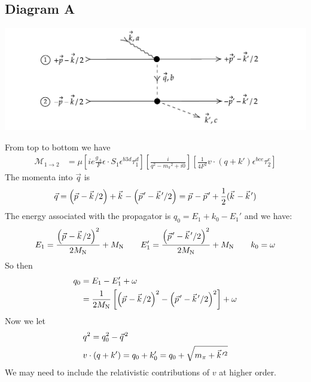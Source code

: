 \documentclass[11pt]{article}
\newcommand\ddfrac[2]{\frac{\displaystyle #1}{\displaystyle #2}}
\newcommand{\vectorwithspace}[1]{\vec{#1}\mkern2mu\vphantom{#1}}
\newcommand{\kv}{\vectorwithspace{k}}
\newcommand{\pv}{\vectorwithspace{p}}
\newcommand{\qv}{\vectorwithspace{q}}
\newcommand{\kpv}{\kv'}
\newcommand{\mpi}{\ensuremath{m_\pi}}
\newcommand{\ga}{\ensuremath{g_A}}
\newcommand{\MN}{\ensuremath{M_\mathrm{N}}} %
\newcommand{\calM}{\mathcal{M}} \newcommand{\calN}{\mathcal{N}}
\begin{document}
\subsection{Diagram A}
\begin{center}
	\includegraphics[scale=0.9]{2B-diagA.pdf}
\end{center}
From top to bottom we have
\begin{align}
	\calM_{1\to2} & =\mu \left[ i e \frac{\ga}{F} {\epsilon} \cdot {S}_1
		\epsilon^{b3d} \tau_1^d  \right]
	\left[ \ddfrac{i}{q^2 -\mpi^2+i0 }  \right]
	\left[ \frac{1}{4 F^2} v \cdot \left( q + k' \right) \epsilon^{bce}
		\tau_2^e \right]
\end{align}
The momenta into $\vec{q}$ is
\begin{equation}
	\vec{q}=\left(\pv-\kv/2 \right) +\kv -\left(
	\pv'-\kv'/2\right)=\pv-\pv' +\frac{1}{2} (\kv-\kpv)
\end{equation}
The energy associated with the propagator is $q_0=E_1+k_0-E_1'$ and we have:~\\
\begin{align}
	E_1= \ddfrac{ \left( \pv - \kv/2 \right)^2}{2\MN} +\MN\qquad
	E_1'= \ddfrac{ \left( \pv' - \kv'/2 \right)^2}{2\MN} +\MN\qquad
	k_0= \omega
\end{align}
So then
\begin{align}
	q_0 & =E_1-E_1'+\omega                                     \\
	    & =\frac{1}{2\MN}\left[ \left( \pv - \kv/2 \right)^2 -
		\left( \pv' - \kv'/2 \right)^2\right]+\omega \label{qzero}
\end{align}
Now we let
\begin{align}
	 & q^2 =q_0^2 - \qv^2                                             \\
	 & v \cdot \left( q+k' \right)= q_0+k'_0 =q_0+\sqrt{\mpi +\kv'^2}
\end{align}
We may need to include the relativistic contributions of $v$ at higher order.
\end{document}
